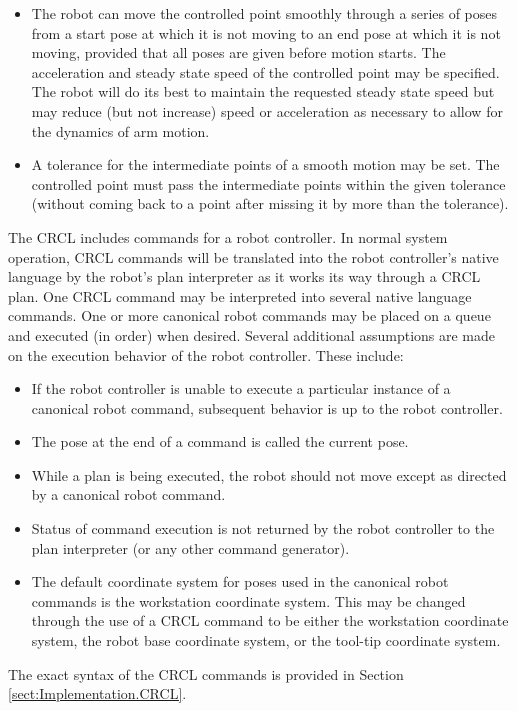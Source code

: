 \begin{itemize}
\item The robot can move the controlled point smoothly through a series of
poses from a start pose at which it is not moving to an end pose at
which it is not moving, provided that all poses are given before
motion starts. The acceleration and steady state speed of the
controlled point may be specified. The robot will do its best to
maintain the requested steady state speed but may reduce (but not
increase) speed or acceleration as necessary to allow for the dynamics
of arm motion.

\item A tolerance for the intermediate points of a smooth motion may be set.
The controlled point must pass the intermediate points within the
given tolerance (without coming back to a point after missing it by
more than the tolerance).
\end{itemize}

The CRCL includes commands for a robot controller. In normal system operation,
CRCL commands will be translated into the robot controller's native
language by the robot's plan interpreter as it works its way through a
CRCL plan. One CRCL command may be interpreted into several native
language commands.
One or more canonical robot commands may be placed on a queue and
executed (in order) when desired. Several additional assumptions are
made on the execution behavior of the robot controller. These include:

\begin{itemize}
\item If the robot controller is unable to execute a particular instance of a
canonical robot command, subsequent behavior is up to the robot
controller.

\item The pose at the end of a command is called the current pose.

\item While a plan is being executed, the robot should not move except as
directed by a canonical robot command.

\item Status of command execution is not returned by the robot controller to
the plan interpreter (or any other command generator).

\item The default coordinate system for poses used in the canonical robot commands is
the workstation coordinate system. This may be changed through the use of
a CRCL command to be either the workstation coordinate system, the
robot base coordinate system, or the tool-tip coordinate system.
\end{itemize}

The exact syntax of the CRCL commands is provided in Section \ref{sect:Implementation.CRCL}.
